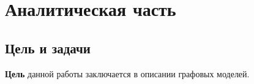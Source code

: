 \chapter{Аналитическая часть}

\section{Цель и задачи}
\textbf{Цель} данной работы заключается в описании графовых моделей.